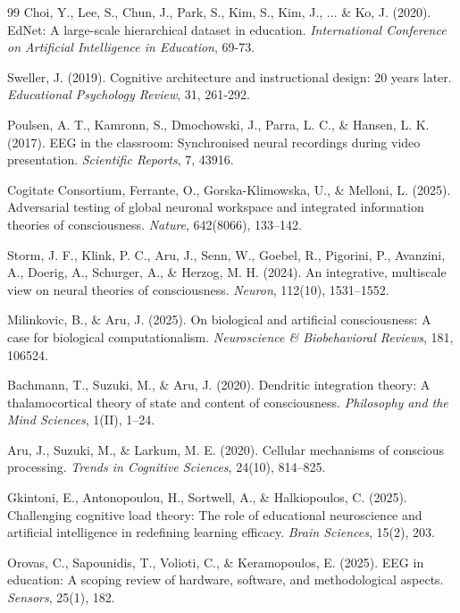 \documentclass[10pt,journal,compsoc]{IEEEtran}
\begin{document}
\begin{thebibliography}{99}
Choi, Y., Lee, S., Chun, J., Park, S., Kim, S., Kim, J., ... \& Ko, J. (2020). EdNet: A large-scale hierarchical dataset in education. \textit{International Conference on Artificial Intelligence in Education}, 69-73.

Sweller, J. (2019). Cognitive architecture and instructional design: 20 years later. \textit{Educational Psychology Review}, 31, 261-292.

Poulsen, A. T., Kamronn, S., Dmochowski, J., Parra, L. C., \& Hansen, L. K. (2017). EEG in the classroom: Synchronised neural recordings during video presentation. \textit{Scientific Reports}, 7, 43916.

Cogitate Consortium, Ferrante, O., Gorska-Klimowska, U., \& Melloni, L. (2025). Adversarial testing of global neuronal workspace and integrated information theories of consciousness. \textit{Nature}, 642(8066), 133--142.

Storm, J. F., Klink, P. C., Aru, J., Senn, W., Goebel, R., Pigorini, P., Avanzini, A., Doerig, A., Schurger, A., \& Herzog, M. H. (2024). An integrative, multiscale view on neural theories of consciousness. \textit{Neuron}, 112(10), 1531--1552.

Milinkovic, B., \& Aru, J. (2025). On biological and artificial consciousness: A case for biological computationalism. \textit{Neuroscience \& Biobehavioral Reviews}, 181, 106524.

Bachmann, T., Suzuki, M., \& Aru, J. (2020). Dendritic integration theory: A thalamocortical theory of state and content of consciousness. \textit{Philosophy and the Mind Sciences}, 1(II), 1--24.

Aru, J., Suzuki, M., \& Larkum, M. E. (2020). Cellular mechanisms of conscious processing. \textit{Trends in Cognitive Sciences}, 24(10), 814--825.

Gkintoni, E., Antonopoulou, H., Sortwell, A., \& Halkiopoulos, C. (2025). Challenging cognitive load theory: The role of educational neuroscience and artificial intelligence in redefining learning efficacy. \textit{Brain Sciences}, 15(2), 203.

Orovas, C., Sapounidis, T., Volioti, C., \& Keramopoulos, E. (2025). EEG in education: A scoping review of hardware, software, and methodological aspects. \textit{Sensors}, 25(1), 182.

\end{thebibliography}
\end{document}

